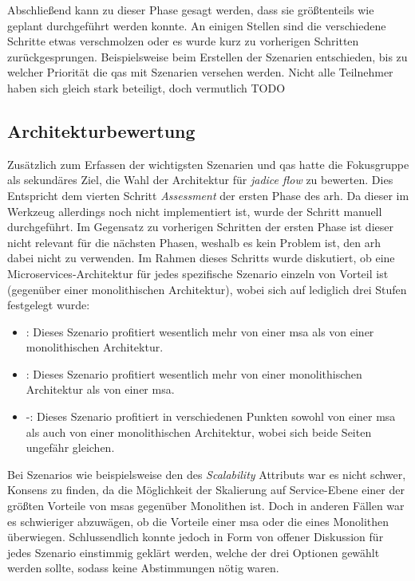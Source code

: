 

Abschließend kann zu dieser Phase gesagt werden, dass sie größtenteils wie geplant durchgeführt werden konnte.
An einigen Stellen sind die verschiedene Schritte etwas verschmolzen oder es wurde kurz zu vorherigen Schritten zurückgesprungen.
Beispielsweise beim Erstellen der Szenarien entschieden, bis zu welcher Priorität die \glspl{qa} mit Szenarien versehen werden.
Nicht alle Teilnehmer haben sich gleich stark beteiligt, doch vermutlich TODO

\subsection{Architekturbewertung}

Zusätzlich zum Erfassen der wichtigsten Szenarien und \glspl{qa} hatte die Fokusgruppe als sekundäres Ziel, die Wahl der Architektur für \emph{jadice flow} zu bewerten. 
Dies Entspricht dem vierten Schritt \emph{Assessment} der ersten Phase des \gls{arh}.
Da dieser im Werkzeug allerdings noch nicht implementiert ist, wurde der Schritt manuell durchgeführt.
Im Gegensatz zu vorherigen Schritten der ersten Phase ist dieser nicht relevant für die nächsten Phasen, weshalb es kein Problem ist, den \gls{arh} dabei nicht zu verwenden.
Im Rahmen dieses Schritts wurde diskutiert, ob eine Microservices-Architektur für jedes spezifische Szenario einzeln von Vorteil ist (gegenüber einer monolithischen Architektur), wobei sich auf lediglich drei Stufen festgelegt wurde:
\begin{itemize}
	\item \advantage\hspace*{0.1cm}: Dieses Szenario profitiert wesentlich mehr von einer \gls{msa} als von einer monolithischen Architektur.
	\item \disadvantage\hspace*{0.1cm}: Dieses Szenario profitiert wesentlich mehr von einer monolithischen Architektur als von einer \gls{msa}.
	\item \hspace*{0.27cm}-\hspace*{0.27cm}: Dieses Szenario profitiert in verschiedenen Punkten sowohl von einer \gls{msa} als auch von einer monolithischen Architektur, wobei sich beide Seiten ungefähr gleichen.
\end{itemize}
Bei Szenarios wie beispielsweise den des \emph{Scalability} Attributs war es nicht schwer, Konsens zu finden, da die Möglichkeit der Skalierung auf Service-Ebene einer der größten Vorteile von \glspl{msa} gegenüber Monolithen ist.
Doch in anderen Fällen war es schwieriger abzuwägen, ob die Vorteile einer \gls{msa} oder die eines Monolithen überwiegen.
Schlussendlich konnte jedoch in Form von offener  Diskussion für jedes Szenario einstimmig geklärt werden, welche der drei Optionen gewählt werden sollte, sodass keine Abstimmungen nötig waren.

